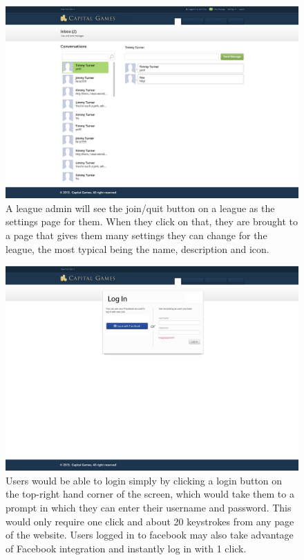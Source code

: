 \begin{figure}
\centering
\includegraphics[width=5.5in]{./mockups/JPEG/messages.jpg}
\caption{A league admin will see the join/quit button on a league as the settings page for them. When they click on that, they are brought to a page that gives them many settings they can change for the league, the most typical being the name, description and icon.}
\end{figure}

{
\begin{figure}
\centering
\includegraphics[width=5.5in]{./mockups/JPEG/Login.jpg}
\caption{Users would be able to login simply by clicking a login button on the top-right hand corner of the screen, which would take them to a prompt in which they can enter their username and password. This would only require one click and about 20 keystrokes from any page of the website. Users logged in to facebook may also take advantage of Facebook integration and instantly log in with 1 click.}
\end{figure}
}


